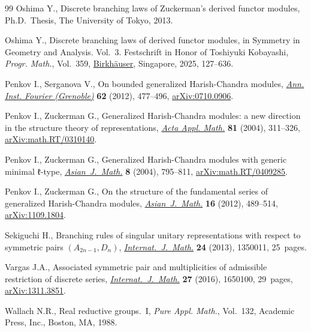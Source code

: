 \documentclass[10pt,a4paper]{amsart}
\numberwithin{equation}{section}
\theoremstyle{definition}
\begin{document}
\begin{thebibliography}{99}
Oshima Y., Discrete branching laws of {Z}uckerman's derived functor modules,
 Ph.D.~Thesis, {T}he University of Tokyo, 2013.

Oshima Y., Discrete branching laws of derived functor modules, in Symmetry in
 Geometry and Analysis. {V}ol.~3. {F}estschrift in Honor of {T}oshiyuki
 {K}obayashi, \textit{Progr. Math.}, Vol.~359,
 \href{https://doi.org/10.1007/978-981-97-7666-5_5}{Birkh\"auser}, Singapore,
 2025, 127--636.

Penkov I., Serganova V., On bounded generalized {H}arish-{C}handra modules,
 \href{https://doi.org/10.5802/aif.2685}{\textit{Ann. Inst. Fourier
 (Grenoble)}} \textbf{62} (2012), 477--496,
 \href{http://arxiv.org/abs/0710.0906}{arXiv:0710.0906}.

Penkov I., Zuckerman G., Generalized {H}arish-{C}handra modules: a new
 direction in the structure theory of representations,
 \href{https://doi.org/10.1023/B:ACAP.0000024204.22996.2c}{\textit{Acta Appl.
 Math.}} \textbf{81} (2004), 311--326,
 \href{http://arxiv.org/abs/math.RT/0310140}{arXiv:math.RT/0310140}.

Penkov I., Zuckerman G., Generalized {H}arish-{C}handra modules with generic
 minimal {$\mathfrak{k}$}-type,
 \href{https://doi.org/10.4310/ajm.2004.v8.n4.a25}{\textit{Asian~J.~Math.}}
 \textbf{8} (2004), 795--811,
 \href{http://arxiv.org/abs/math.RT/0409285}{arXiv:math.RT/0409285}.

Penkov I., Zuckerman G., On the structure of the fundamental series of
 generalized {H}arish-{C}handra modules,
 \href{https://doi.org/10.4310/AJM.2012.v16.n3.a8}{\textit{Asian~J.~Math.}}
 \textbf{16} (2012), 489--514,
 \href{http://arxiv.org/abs/1109.1804}{arXiv:1109.1804}.

Sekiguchi H., Branching rules of singular unitary representations with respect
 to symmetric pairs {$(A_{2n-1},D_n)$},
 \href{https://doi.org/10.1142/S0129167X13500110}{\textit{Internat.~J.~Math.}}
 \textbf{24} (2013), 1350011, 25~pages.

Vargas J.A., Associated symmetric pair and multiplicities of admissible
 restriction of discrete series,
 \href{https://doi.org/10.1142/S0129167X16501007}{\textit{Internat.~J.~Math.}}
 \textbf{27} (2016), 1650100, 29~pages,
 \href{http://arxiv.org/abs/1311.3851}{arXiv:1311.3851}.

Wallach N.R., Real reductive groups.~{I}, \textit{Pure Appl. Math.}, Vol.~132,
 Academic Press, Inc., Boston, MA, 1988.

\end{thebibliography}
\end{document}
